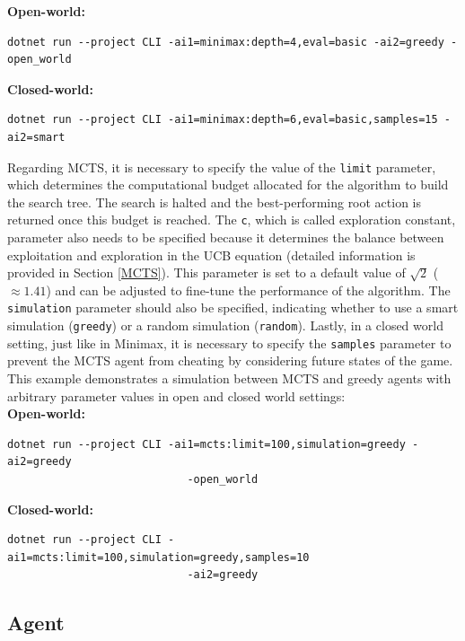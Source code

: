 \textbf{Open-world: }
\begin{lstlisting}[frame=single]
dotnet run --project CLI -ai1=minimax:depth=4,eval=basic -ai2=greedy -open_world
\end{lstlisting}

\textbf{Closed-world: }
\begin{lstlisting}[frame=single]
dotnet run --project CLI -ai1=minimax:depth=6,eval=basic,samples=15 -ai2=smart
\end{lstlisting}

Regarding MCTS, it is necessary to specify the value of the \texttt{limit} parameter, which determines the computational budget allocated for the algorithm to build the search tree. The search is halted and the best-performing root action is returned once this budget is reached. The \texttt{c}, which is called exploration constant, parameter also needs to be specified because it determines the balance between exploitation and exploration in the UCB equation (detailed information is provided in Section \ref{MCTS}). This parameter is set to a default value of  $\sqrt{2}$ ($\approx 1.41$) and can be adjusted to fine-tune the performance of the algorithm. The \texttt{simulation} parameter should also be specified, indicating whether to use a smart simulation (\texttt{greedy}) or a random simulation (\texttt{random}). Lastly, in a closed world setting, just like in Minimax, it is necessary to specify the \texttt{samples} parameter to prevent the MCTS agent from cheating by considering future states of the game. This example demonstrates a simulation between MCTS and greedy agents with arbitrary parameter values in open and closed world settings: \\

\textbf{Open-world: }
\begin{lstlisting}[frame=single]
dotnet run --project CLI -ai1=mcts:limit=100,simulation=greedy -ai2=greedy 
							-open_world
\end{lstlisting}

\textbf{Closed-world: }
\begin{lstlisting}[frame=single]
dotnet run --project CLI -ai1=mcts:limit=100,simulation=greedy,samples=10 
							-ai2=greedy
\end{lstlisting}



\subsection{Agent}

